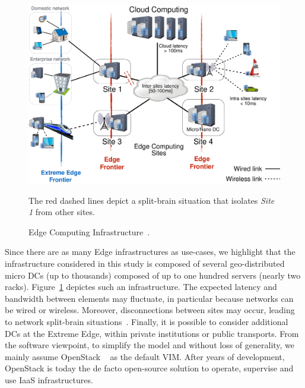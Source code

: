 \begin{figure}[t]
  \centering
  \includegraphics[width=.95\columnwidth]{./figures/figure_fog.pdf}
    \vspace*{-.2cm}
  \caption{Edge Computing Infrastructure~\cite{7923796}.}
    {\small The red dashed lines depict a split-brain situation that isolates
    \emph{Site 1} from other sites.}
  \label{fig:fogedge-archi}
  \vspace*{-.3cm}
\end{figure}

Since there are as many Edge infrastructures as use-cases, we
highlight that the infrastructure considered in this
study is composed
 of several
geo-distributed micro DCs (up to thousands)
composed of up to one hundred servers (nearly two racks).
Figure~\ref{fig:fogedge-archi} depictes such an infrastructure.
The expected latency and bandwidth between elements may fluctuate, in particular because
networks can be wired or wireless. Moreover, disconnections
between sites may occur, leading to network split-brain
situations~\cite{4456903}.
Finally, it is possible to consider additional DCs at the Extreme Edge, within private institutions or public transports.
%
From the software viewpoint, to simplify the model and
without loss of generality, we mainly assume OpenStack ~\cite{openstack:www} as the default VIM.  After years of development, OpenStack is today the de facto open-source solution to operate, supervise and use
IaaS infrastructures.

